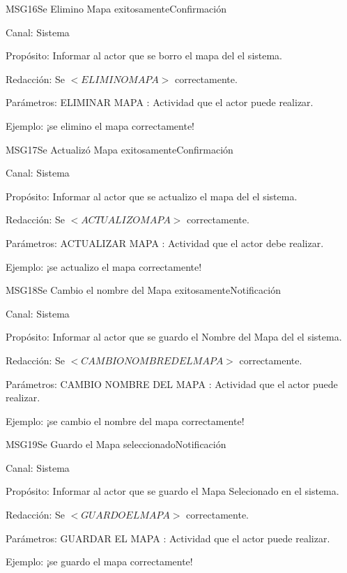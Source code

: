 \begin{mensaje}{MSG16}{Se Elimino Mapa exitosamente}{Confirmación \msgConfirm}
	\item[Canal:] Sistema
    \item[Propósito:] Informar al actor que  se borro el mapa del el sistema.
    \item[Redacción:] Se $<ELIMINO MAPA>$  correctamente.
    \item[Parámetros:] ELIMINAR MAPA : Actividad que el actor puede realizar.
    \item[Ejemplo:] ¡se elimino el mapa correctamente!
\end{mensaje}
\begin{mensaje}{MSG17}{Se Actualizó Mapa exitosamente}{Confirmación \msgConfirm}
	\item[Canal:] Sistema
    \item[Propósito:] Informar al actor que se actualizo el mapa del el sistema.
    \item[Redacción:] Se $<ACTUALIZO MAPA>$  correctamente.
    \item[Parámetros:] ACTUALIZAR MAPA : Actividad que el actor debe realizar.
    \item[Ejemplo:] ¡se actualizo el mapa correctamente!
\end{mensaje}
\begin{mensaje}{MSG18}{Se Cambio el nombre del Mapa exitosamente}{Notificación \msgNotif}
	\item[Canal:] Sistema
    \item[Propósito:] Informar al actor que se guardo el Nombre del Mapa del el sistema.
    \item[Redacción:] Se $<CAMBIO NOMBRE DEL MAPA>$  correctamente.
    \item[Parámetros:] CAMBIO NOMBRE DEL MAPA : Actividad que el actor puede realizar.
    \item[Ejemplo:] ¡se cambio el nombre del mapa correctamente!
\end{mensaje}
\begin{mensaje}{MSG19}{Se Guardo el Mapa seleccionado}{Notificación \msgNotif}
	\item[Canal:] Sistema
    \item[Propósito:] Informar al actor que se guardo el Mapa Selecionado en el sistema.
    \item[Redacción:] Se $<GUARDO EL MAPA>$  correctamente.
    \item[Parámetros:] GUARDAR EL MAPA : Actividad que el actor puede realizar.
    \item[Ejemplo:] ¡se guardo el mapa correctamente!
\end{mensaje}